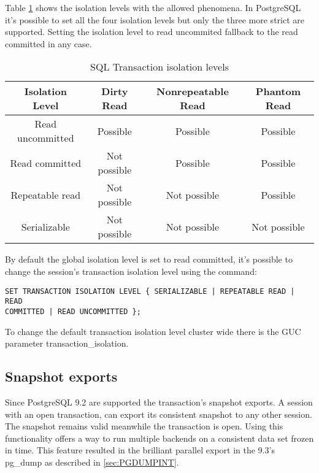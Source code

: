Table \ref{tab:TRNISOLATION} shows the isolation levels with the 
allowed phenomena. In PostgreSQL it's possible to set all the four 
isolation levels but only the three more strict are supported. Setting the 
isolation level to read uncommited fallback to the read committed in any case.

\begin{table}[H]
  \begin{tabular}{cccc}
    Isolation Level & Dirty Read    &    Nonrepeatable Read   &   Phantom 
Read\\ 
    \hline
    Read uncommitted  &  Possible    &    Possible     &   Possible\\
    Read committed    &  Not possible &  Possible     &   Possible\\
    Repeatable read   &  Not possible  & Not possible  &  Possible\\
    Serializable      &  Not possible  & Not possible   & Not possible\\
  \end{tabular}
  \caption{\label{tab:TRNISOLATION}SQL Transaction isolation levels}
\end{table}

By default the global isolation level is set to read committed, it's possible 
to change the session's transaction isolation level using the command:
\begin{lstlisting}[style=pgsql]
SET TRANSACTION ISOLATION LEVEL { SERIALIZABLE | REPEATABLE READ | READ 
COMMITTED | READ UNCOMMITTED }; 
\end{lstlisting}

To change the default transaction isolation level cluster wide there is the GUC 
parameter transaction\_isolation.


\subsection{Snapshot exports}
\label{sub:SNAPEXPORT}
Since PostgreSQL 9.2 are supported the transaction's snapshot exports. A session with an open 
transaction, can export its consistent snapshot to any other session. The snapshot remains valid 
meanwhile the transaction is open. Using this functionality offers a way to run multiple backends 
on a consistent data set frozen in time. This feature resulted in the brilliant parallel export in 
the 9.3's pg\_dump as described in \ref{sec:PGDUMPINT}.\newline

